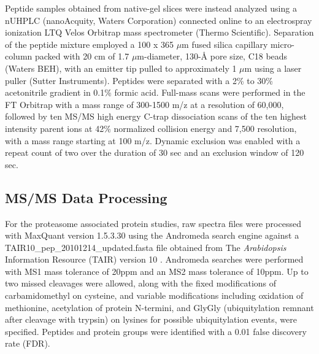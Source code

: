 Peptide samples obtained from native-gel slices were instead analyzed using a nUHPLC (nanoAcquity, Waters Corporation) connected online to an electrospray ionization LTQ Velos Orbitrap mass spectrometer (Thermo Scientific).  Separation of the peptide mixture employed a 100 x 365 $\mu$m fused silica capillary micro-column packed with 20 cm of 1.7 $\mu$m-diameter, 130-Å pore size, C18 beads (Waters BEH), with an emitter tip pulled to approximately 1 $\mu$m using a laser puller (Sutter Instruments).  Peptides were separated with a 2\% to 30\% acetonitrile gradient in 0.1\% formic acid.  Full-mass scans were performed in the FT Orbitrap with a mass range of 300-1500 m/z at a resolution of 60,000, followed by ten MS/MS high energy C-trap dissociation scans of the ten highest intensity parent ions at 42\% normalized collision energy and 7,500 resolution, with a mass range starting at 100 m/z.  Dynamic exclusion was enabled with a repeat count of two over the duration of 30 sec and an exclusion window of 120 sec.

\subsection{MS/MS Data Processing}
For the proteasome associated protein studies, raw spectra files were processed with MaxQuant version 1.5.3.30 \citep{cox08} using the Andromeda search engine against a TAIR10\_pep\_20101214\_updated.fasta file obtained from The \textit{Arabidopsis} Information Resource (TAIR) version 10 \citep{berardini15}. Andromeda searches were performed with MS1 mass tolerance of 20ppm and an MS2 mass tolerance of 10ppm. Up to two missed cleavages were allowed, along with the fixed modifications of carbamidomethyl on cysteine, and variable modifications including oxidation of methionine, acetylation of protein N-termini, and GlyGly (ubiquitylation remnant after cleavage with trypsin) on lysines for possible ubiquitylation events, were specified. Peptides and protein groups were identified with a 0.01 false discovery rate (FDR). 

